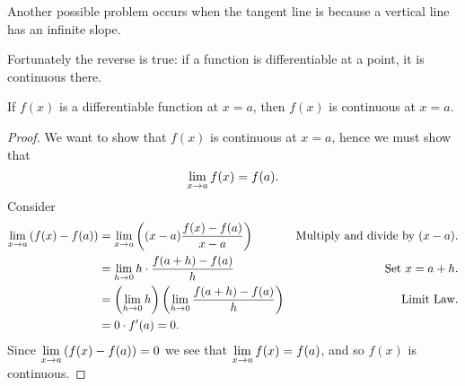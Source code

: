 Another possible problem occurs when the tangent line is  because a vertical line has an infinite slope.

Fortunately the reverse is true: if a function is differentiable at a point, it is continuous there.

\begin{theorem}\label{theorem:diff-cont}
    If $f(x)$ is a differentiable function at $x = a$, then $f(x)$ is continuous at $x=a$.
    
    \begin{proof}
    We want to show that $f(x)$ is continuous at $x=a$, hence we must show that 
    \[
    \displaystyle\lim\limits_{x\to a} f(x) = f(a).
    \]
    Consider
    \begin{align*}
    \displaystyle\lim\limits_{x\to a} \left(f(x) - f(a)\right) &= \displaystyle\lim\limits_{x\to a} \left((x-a)\frac{f(x) - f(a)}{x-a}\right) &\text{Multiply and divide by $(x-a)$.} \\
    &= \displaystyle\lim\limits_{h\to 0} h \cdot \frac{f(a+h) - f(a)}{h} &\text{Set $x = a+h$.} \\
    &= \left(\displaystyle\lim\limits_{h\to 0} h\right) \left(\displaystyle\lim\limits_{h\to 0}\frac{f(a+h) - f(a)}{h}\right) &\text{Limit Law.} \\
    &= 0\cdot f'(a) = 0.
    \end{align*}
    Since $\displaystyle\lim\limits_{x\to a}\left(f(x) - f(a)\right) = 0 $
    we see that $\displaystyle\lim\limits_{x\to a} f(x) = f(a)$, and so $f(x)$ is continuous.
    \end{proof}
\cite{mooc}
\end{theorem}

